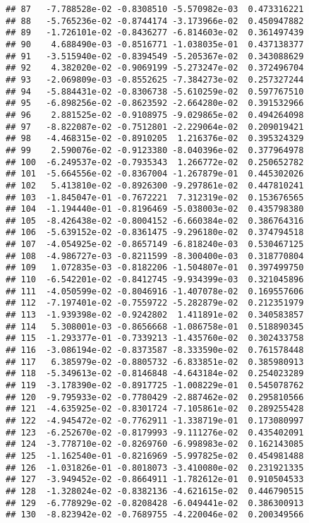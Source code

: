 \documentclass[
]{article}
\begin{document}
\begin{verbatim}
## 87   -7.788528e-02 -0.8308510 -5.570982e-03  0.473316221
## 88   -5.765236e-02 -0.8744174 -3.173966e-02  0.450947882
## 89   -1.726101e-02 -0.8436277 -6.814603e-02  0.361497439
## 90    4.688490e-03 -0.8516771 -1.038035e-01  0.437138377
## 91   -3.515940e-02 -0.8394549 -5.205367e-02  0.343088629
## 92    4.382020e-02 -0.9069199 -5.273247e-02  0.372496704
## 93   -2.069809e-03 -0.8552625 -7.384273e-02  0.257327244
## 94   -5.884431e-02 -0.8306738 -5.610259e-02  0.597767510
## 95   -6.898256e-02 -0.8623592 -2.664280e-02  0.391532966
## 96    2.881525e-02 -0.9108975 -9.029865e-02  0.494264098
## 97   -8.822087e-02 -0.7512801 -2.229064e-02  0.209019421
## 98   -4.468315e-02 -0.8910205  1.216376e-02  0.395324329
## 99    2.590076e-02 -0.9123380 -8.040396e-02  0.377964978
## 100  -6.249537e-02 -0.7935343  1.266772e-02  0.250652782
## 101  -5.664556e-02 -0.8367004 -1.267879e-01  0.445302026
## 102   5.413810e-02 -0.8926300 -9.297861e-02  0.447810241
## 103  -1.845047e-01 -0.7672221  7.312319e-02  0.153676565
## 104  -1.194440e-01 -0.8196469 -5.038003e-02  0.435798380
## 105  -8.426438e-02 -0.8004152 -6.660384e-02  0.386764316
## 106  -5.639152e-02 -0.8361475 -9.296180e-02  0.374794518
## 107  -4.054925e-02 -0.8657149 -6.818240e-03  0.530467125
## 108  -4.986727e-03 -0.8211599 -8.300400e-03  0.318770804
## 109   1.072835e-03 -0.8182206 -1.504807e-01  0.397499750
## 110  -6.542201e-02 -0.8412745 -9.934399e-03  0.321045896
## 111  -4.050599e-02 -0.8046916 -1.407078e-02  0.169557606
## 112  -7.197401e-02 -0.7559722 -5.282879e-02  0.212351979
## 113  -1.939398e-02 -0.9242802  1.411891e-02  0.340583857
## 114   5.308001e-03 -0.8656668 -1.086758e-01  0.518890345
## 115  -1.293377e-01 -0.7339213 -1.435760e-02  0.302433758
## 116  -3.086194e-02 -0.8373587 -8.333590e-02  0.761578448
## 117   6.385979e-02 -0.8805732 -6.833851e-02  0.385980913
## 118  -5.349613e-02 -0.8146848 -4.643184e-02  0.254023289
## 119  -3.178390e-02 -0.8917725 -1.008229e-01  0.545078762
## 120  -9.795933e-02 -0.7780429 -2.887462e-02  0.295810566
## 121  -4.635925e-02 -0.8301724 -7.105861e-02  0.289255428
## 122  -4.945472e-02 -0.7762911 -1.338719e-01  0.173080997
## 123  -6.252670e-02 -0.8179993 -9.111276e-02  0.435402091
## 124  -3.778710e-02 -0.8269760 -6.998983e-02  0.162143085
## 125  -1.162540e-01 -0.8216969 -5.997825e-02  0.454981488
## 126  -1.031826e-01 -0.8018073 -3.410080e-02  0.231921335
## 127  -3.949452e-02 -0.8664911 -1.782612e-01  0.910504533
## 128  -1.328024e-02 -0.8382136 -4.621615e-02  0.446790515
## 129  -6.778929e-02 -0.8208428 -6.049441e-02  0.386300913
## 130  -8.823942e-02 -0.7689755 -4.220046e-02  0.200349566

\end{verbatim}
\end{document}
